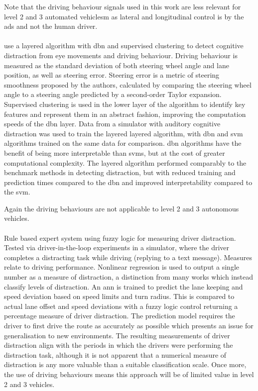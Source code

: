 \documentclass[11pt, parskip=half*,twoside=false]{scrbook}
\begin{document}
Note that the driving behaviour signals used in this work are less relevant for level 2 and 3 automated vehiclesm as lateral and longitudinal control is by the \gls{ads} and not the human driver.

\paragraph{\citet{liangHybridBayesianNetwork2014}} use a layered algorithm with \gls{dbn} and supervised clustering to detect cognitive distraction from eye movements and driving behaviour. Driving behaviour is measured as the standard deviation of both steering wheel angle and lane position, as well as steering error. Steering error is a metric of steering smoothness proposed by the authors, calculated by comparing the steering wheel angle to a steering angle predicted by a second-order Taylor expansion. Supervised clustering is used in the lower layer of the algorithm to identify key features and represent them in an abstract fashion, improving the computation speeds of the \gls{dbn} layer.  Data from a simulator with auditory cognitive distraction was used to train the layered layered algorithm, with \gls{dbn} and \gls{svm} algorithms trained on the same data for comparison. \gls{dbn} algorithms have the benefit of being more interpretable than \glspl{svm}, but at the cost of greater computational complexity. The layered algorithm performed comparably to the benchmark methods in detecting distraction, but with reduced training and prediction times compared to the \gls{dbn} and improved interpretability compared to the \gls{svm}. 

Again the driving behaviours are not applicable to level 2 and 3 autonomous vehicles.

\paragraph{\citet{aksjonovDetectionEvaluationDriver2019}} Rule based expert system using fuzzy logic for measuring driver distraction. Tested via driver-in-the-loop experiments in a simulator, where the driver completes a distracting task while driving (replying to a text message). Measures relate to driving performance. Nonlinear regression is used to output a single number as a measure of distraction, a distinction from many works which instead classify levels of distraction. An \gls{ann} is trained to predict the lane keeping and speed deviation based on speed limits and turn radius. This is compared to actual lane offset and speed deviations with a fuzzy logic control returning a percentage measure of driver distraction. The prediction model requires the driver to first drive the route as accurately as possible which presents an issue for generalisation to new environments. The resulting measurements of driver distraction align with the periods in which the drivers were performing the distraction task, although it is not apparent that a numerical measure of distraction is any more valuable than a suitable classification scale. Once more, the use of driving behaviours means this approach will be of limited value in level 2 and 3 vehicles.
\end{document}
